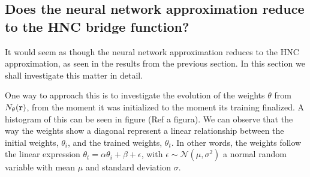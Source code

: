 \subsection{Does the neural network approximation reduce to the HNC bridge function?}
It would seem as though the neural network approximation reduces to the HNC
approximation, as seen in the results from the previous section. In this section
we shall investigate this matter in detail.

One way to approach this is to investigate the evolution of the weights $\theta$ from
$N_{\theta}(\mathbf{r})$, from the moment it was initialized to the moment its training finalized.
A histogram of this can be seen in figure (Ref a figura). We can observe that the way
the weights show a diagonal represent a linear relationship between the initial
weights, $\theta_{i}$, and the trained weights, $\theta_{t}$. In other words,
the weights follow the linear expression
$\theta_{t} = \alpha \theta_{i} + \beta + \epsilon$, with
$\epsilon \sim \mathcal{N}(\mu, \sigma^{2})$ a normal random variable with mean
$\mu$ and standard deviation $\sigma$.
